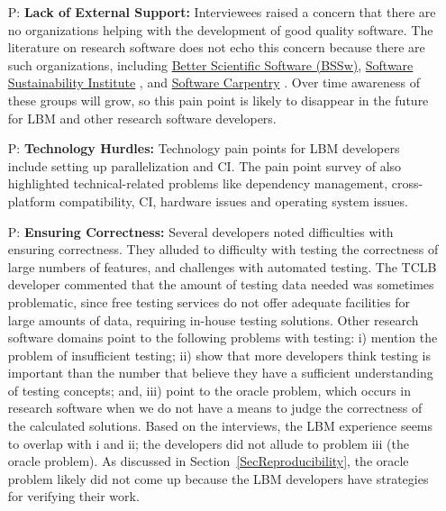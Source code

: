 \documentclass[final, 3p, times, authoryear]{elsarticle}
\newcounter{pnum} %
\begin{document}
\begin{enumerate}
	\item[P\refstepcounter{pnum}\thepnum \label{P_LackExtSupport}:] \textbf{Lack
	of External Support:} Interviewees raised a concern that there are no
	organizations helping with the development of good quality software.  The
	literature on research software does not echo this concern because
	there are such organizations, including \href{https://bssw.io/} {Better
	Scientific Software (BSSw)},
	\href{https://www.software.ac.uk/} {Software Sustainability Institute}
	\citep{CrouchEtAl2013}, and \href{https://software-carpentry.org/}{Software
	Carpentry} \citep{WilsonAndLumsdaine2006, Wilson2016}. Over time awareness
	of these groups will grow, so this pain point is likely to disappear in the
	future for LBM and other research software developers.

	\item[P\refstepcounter{pnum}\thepnum \label{P_TechnologyHurdles}:]
	\textbf{Technology Hurdles:} Technology pain points for LBM developers
	include setting up parallelization and CI. The pain
	point survey of \citet{WieseEtAl2019} also highlighted technical-related
	problems like dependency management, cross-platform compatibility,
	CI, hardware issues and operating system issues.

	\item[P\refstepcounter{pnum}\thepnum \label{P_Correctness}:]
	\textbf{Ensuring Correctness:} Several developers noted difficulties with
	ensuring correctness. They alluded to difficulty with testing the
	correctness of large numbers of features, and challenges with automated
	testing. The TCLB developer commented that the amount of testing data needed
	was sometimes problematic, since free testing services do not offer adequate
	facilities for large amounts of data, requiring in-house testing solutions.
	Other research software domains point to the following problems with
	testing: i) \citet{PintoEtAl2018} mention the problem of insufficient
	testing; ii) \citet{HannayEtAl2009} show that more developers
	think testing is important than the number that believe they have a
	sufficient understanding of testing concepts; and, iii) 
	\citet{HannayEtAl2009, KanewalaAndBieman2013, KellyEtAl2011, WieseEtAl2019}
	point to the oracle problem, which occurs in research software when we do
	not have a means to judge the correctness of the calculated solutions. Based
	on the interviews, the LBM experience seems to overlap with i and ii; the
	developers did not allude to problem iii (the oracle problem).  As discussed
	in Section~\ref{SecReproducibility}, the oracle problem likely did not come
	up because the LBM developers have strategies for verifying their work.


\end{enumerate}
\end{document}
